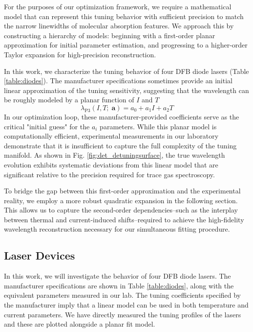 \documentclass[12pt]{report}
\begin{document}
	For the purposes of our optimization framework, we require a mathematical model that can represent this tuning behavior with sufficient precision to match the narrow linewidths of molecular absorption features. We approach this by constructing a hierarchy of models: beginning with a first-order planar approximation for initial parameter estimation, and progressing to a higher-order Taylor expansion for high-precision reconstruction.
	
	In this work, we characterize the tuning behavior of four DFB diode lasers (Table \ref{table:diodes}). The manufacturer specifications sometimes provide an initial linear approximation of the tuning sensitivity, suggesting that the wavelength can be roughly modeled by a planar function of $I$ and $T$
	\begin{equation} \label{det_plane_P3}
		\lambda_{\mathrm{P3}}(I, T;\;\mathbf{a}) = a_0 + a_1 I + a_2 T
	\end{equation}
	In our optimization loop, these manufacturer-provided coefficients serve as the critical "initial guess" for the $a_i$ parameters. While this planar model is computationally efficient, experimental measurements in our laboratory demonstrate that it is insufficient to capture the full complexity of the tuning manifold. As shown in Fig. \ref{fig:det_detuningsurface}, the true wavelength evolution exhibits systematic deviations from this linear model that are significant relative to the precision required for trace gas spectroscopy.
	
	To bridge the gap between this first-order approximation and the experimental reality, we employ a more robust quadratic expansion in the following section. This allows us to capture the second-order dependencies--such as the interplay between thermal and current-induced shifts--required to achieve the high-fidelity wavelength reconstruction necessary for our simultaneous fitting procedure.
	
	\subsection{Laser Devices}
	
	In this work, we will investigate the behavior of four DFB diode lasers. The manufacturer specifications are shown in Table \ref{table:diodes}, along with the equivalent parameters measured in our lab. The tuning coefficients specified by the manufacturer imply that a linear model can be used in both temperature and current parameters. We have directly measured the tuning profiles of the lasers and these are plotted alongside a planar fit model. 
	
\end{document}
